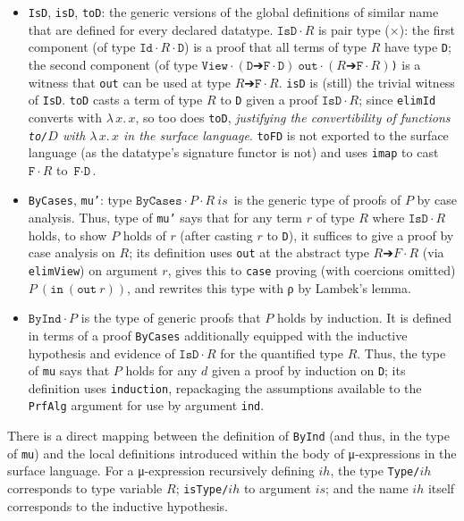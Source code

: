 \documentclass{article}
\newcommand{\absu}[3]{{#1}\, #2.\, #3}
\begin{document}
\begin{itemize}
\item \texttt{IsD}, \texttt{isD}, \texttt{toD}: the generic versions of
  the global definitions of similar name that are defined for every declared
  datatype. $\texttt{IsD} ·R$ is pair type ($\times$): the first
  component (of type \(\texttt{Id} ·R ·\texttt{D}\)) is a proof that all terms of type $R$
  have type \texttt{D}; the second component (of type \(\texttt{View} ·(\texttt{D}
  ➔ \texttt{F} ·\texttt{D})\ \texttt{out} ·(R ➔ \texttt{F} ·R)\)\texttt) is a
  witness that \texttt{out} can be used at type \(R ➔
  \texttt{F} ·R\).
  \texttt{isD} is (still) the trivial witness of \texttt{IsD}. \texttt{toD} casts a
  term of type $R$ to \texttt{D} given a proof \(\texttt{IsD} ·R\); since
  \texttt{elimId} converts with $\absu{λ}{x}{x}$, so too does \texttt{toD},
  \textit{justifying the convertibility of functions \texttt{to/$D$} with \(\absu{λ}{x}{x}\) in the
    surface language}. \texttt{toFD} is not exported to the
  surface language (as the datatype's signature functor is not) and uses
  \texttt{imap} to cast \(\texttt{F} ·R\) to \(\texttt{F} ·\texttt{D}\).
  
\item \texttt{ByCases}, \texttt{mu'}: type \(\texttt{ByCases} ·P ·R\ is\,\) is the generic
  type of proofs of $P$ by case analysis. Thus,
  type of \texttt{mu'} says 
  that for any term $r$ of type $R$ where \(\texttt{IsD} ·R\) holds, to show
  $P$ holds of $r$ (after casting $r$ to \texttt{D}), it suffices to give a
  proof by case analysis on $R$; its definition uses \texttt{out} at the abstract type
  $R ➔ F ·R$ (via \texttt{elimView}) on argument $r$, gives this to
  \texttt{case} proving (with coercions omitted) \(P\ (\texttt{in}\
  (\texttt{out}\ r))\), and rewrites this type with ρ by Lambek's lemma.

\item \(\texttt{ByInd} · P\) is the type of generic proofs that $P$ holds by
  induction. It is defined in terms of a proof \texttt{ByCases} additionally
  equipped with the inductive hypothesis and evidence of \(\texttt{IsD} ·R\) for
  the quantified type $R$. Thus, the type of \texttt{mu} says that $P$ holds for any $d$ given a proof by
  induction on \texttt{D}; its definition uses \texttt{induction}, repackaging the
  assumptions available to the \texttt{PrfAlg} argument for use by argument \texttt{ind}.
\end{itemize}

There is a direct mapping between the definition of \texttt{ByInd} (and thus, in
the type of \texttt{mu}) and the local definitions introduced within the body of
μ-expressions in the surface language. For a μ-expression recursively defining
$ih$, the type \texttt{Type/}$ih$ corresponds to type variable
$R$; \texttt{isType/}$ih$ to argument $is$; and the name $ih$
itself corresponds to the inductive hypothesis.
\end{document}
